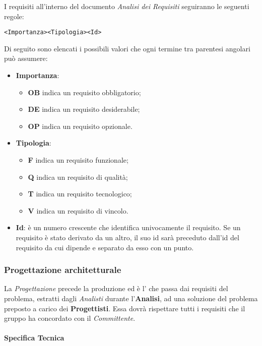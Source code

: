 \documentclass{scalatekids-article}
\begin{document}
\label{sec:adr}
I requisiti all'interno del documento \textit{Analisi dei Requisiti} seguiranno le seguenti regole:
\begin{center}
  \verb=<Importanza><Tipologia><Id>=
\end{center}
Di seguito sono elencati i possibili valori che ogni termine tra parentesi angolari può assumere:
\begin{itemize}
\item \textbf{Importanza}:
  \begin{itemize}
  \item \textbf{OB} indica un requisito obbligatorio;
  \item \textbf{DE} indica un requisito desiderabile;
  \item \textbf{OP} indica un requisito opzionale.
  \end{itemize}
\item \textbf{Tipologia}:
  \begin{itemize}
  \item \textbf{F} indica un requisito funzionale;
  \item \textbf{Q} indica un requisito di qualità;
  \item \textbf{T} indica un requisito tecnologico;
  \item \textbf{V} indica un requisito di vincolo.
  \end{itemize}
\item \textbf{Id}: è un numero crescente che identifica univocamente il
  requisito. Se un requisito è stato derivato da un altro, il suo id sarà
  preceduto dall'id del requisito da cui dipende e separato da esso con un
  punto.
\end{itemize}

\subsubsection{Progettazione architetturale}

La \textit{Progettazione} precede la produzione ed è l' che
passa dai requisiti del problema, estratti dagli \textit{Analisti} durante
l'\textbf{Analisi}, ad una soluzione del problema preposto a carico dei
\textbf{Progettisti}. Essa dovrà rispettare tutti i requisiti che il gruppo ha
concordato con il \textit{Committente}.\\

\paragraph{Specifica Tecnica}
\end{document}
